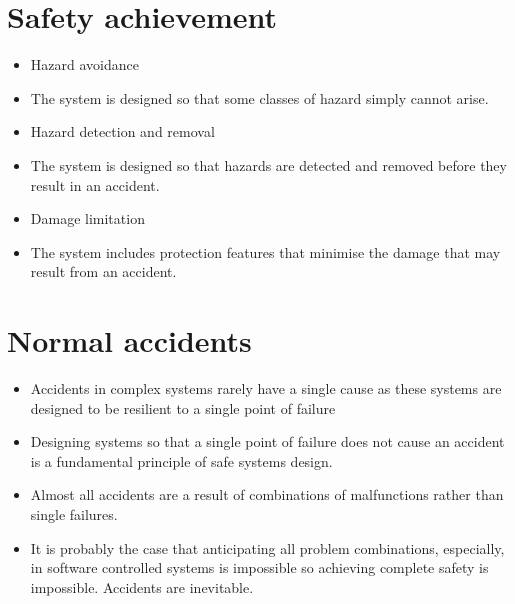\section{Safety achievement}
\begin{itemize}
\item Hazard avoidance

  \item The system is designed so that some classes of hazard simply cannot arise.

\item Hazard detection and removal

  \item The system is designed so that hazards are detected and removed before they result in an accident.

\item Damage limitation

  \item The system includes protection features that minimise the damage that may result from an accident.

\end{itemize}
\section{Normal accidents}
\begin{itemize}
\item Accidents in complex systems rarely have a single cause as these systems are designed to be resilient to a single point of failure

  \item Designing systems so that a single point of failure does not cause an accident is a fundamental principle of safe systems design.

\item Almost all accidents are a result of combinations of malfunctions rather than single failures.

\item It is probably the case that anticipating all problem combinations, especially, in software controlled systems is impossible so achieving complete safety is impossible. Accidents are inevitable.

\end{itemize}
